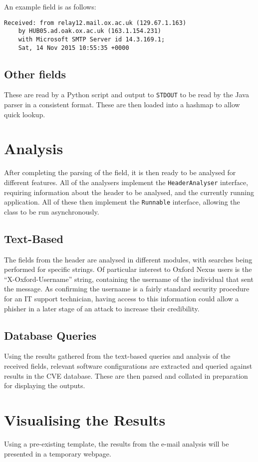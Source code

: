 An example field is as follows:
\begin{verbatim}
Received: from relay12.mail.ox.ac.uk (129.67.1.163) 
    by HUB05.ad.oak.ox.ac.uk (163.1.154.231) 
    with Microsoft SMTP Server id 14.3.169.1;
    Sat, 14 Nov 2015 10:55:35 +0000
\end{verbatim}
\subsection{Other fields}
These are read by a Python script and output to \texttt{STDOUT} to be read by the Java parser in a consistent format.  These are then loaded into a hashmap to allow quick lookup.

\section{Analysis}
After completing the parsing of the field, it is then ready to be analysed for different features.  All of the analysers implement the \texttt{HeaderAnalyser} interface, requiring information about the header to be analysed, and the currently running application.  All of these then implement the \texttt{Runnable} interface, allowing the class to be run asynchronously.

\subsection{Text-Based}
The fields from the header are analysed in different modules, with searches being performed for specific strings.  Of particular interest to Oxford Nexus users is the ``X-Oxford-Username'' string, containing the username of the individual that sent the message.  As confirming the username is a fairly standard security procedure for an IT support technician, having access to this information could allow a phisher in a later stage of an attack to increase their credibility.

\subsection{Database Queries}
Using the results gathered from the text-based queries and analysis of the received fields, relevant software configurations are extracted and queried against results in the CVE database.  These are then parsed and collated in preparation for displaying the outputs.

\section{Visualising the Results}
Using a pre-existing template, the results from the e-mail analysis will be presented in a temporary webpage.
